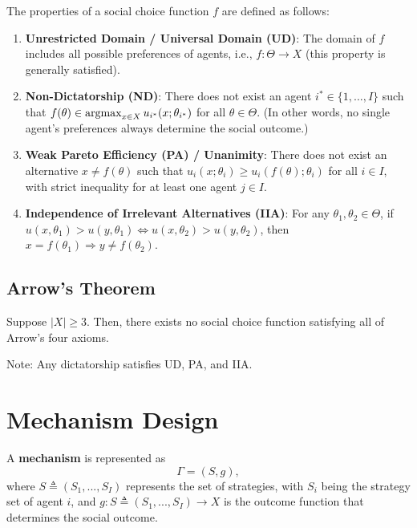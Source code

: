 \documentclass[11pt]{elegantbook_2}
\newcommand{\argmax}{\operatornamewithlimits{argmax}}
\begin{document}
\begin{definition}\label{SWF_properties}
    The properties of a social choice function $f$ are defined as follows:
    \begin{enumerate}[$\circ$]
        \item \textbf{Unrestricted Domain / Universal Domain (UD)}: The domain of $f$ includes all possible preferences of agents, i.e., $f:\Theta \rightarrow X$ (this property is generally satisfied).
        \item \textbf{Non-Dictatorship (ND)}: There does not exist an agent $i^* \in \{1, \dots, I\}$ such that $f(\theta) \in \argmax_{x \in X} u_{i^*}(x; \theta_{i^*})$ for all $\theta \in \Theta$. (In other words, no single agent's preferences always determine the social outcome.)
        \item \textbf{Weak Pareto Efficiency (PA) / Unanimity}: There does not exist an alternative $x \neq f(\theta)$ such that $u_i(x; \theta_i) \geq u_i(f(\theta); \theta_i)$ for all $i \in I$, with strict inequality for at least one agent $j \in I$.
        \item \textbf{Independence of Irrelevant Alternatives (IIA)}: For any $\theta_1, \theta_2 \in \Theta$, if $u(x, \theta_1) > u(y, \theta_1) \Leftrightarrow u(x, \theta_2) > u(y, \theta_2)$, then $x = f(\theta_1) \Rightarrow y \neq f(\theta_2)$.
    \end{enumerate}
\end{definition}


\subsection{Arrow's Theorem}
\begin{theorem}\label{Arrow_Theorem}
    Suppose $|X|\geq 3$. Then, there exists no social choice function satisfying all of Arrow's four axioms.
\end{theorem}
Note: Any dictatorship satisfies UD, PA, and IIA.

\section{Mechanism Design}
\begin{definition}[Mechanism $\Gamma=(S,g)$]
    A \textbf{mechanism} is represented as $$\Gamma=\left(S, g\right),$$
    where $S\triangleq(S_1,...,S_I)$ represents the set of strategies, with $S_i$ being the strategy set of agent $i$, and $g:S\triangleq(S_1,...,S_I) \rightarrow X$ is the outcome function that determines the social outcome.
\end{definition}
\end{document}
